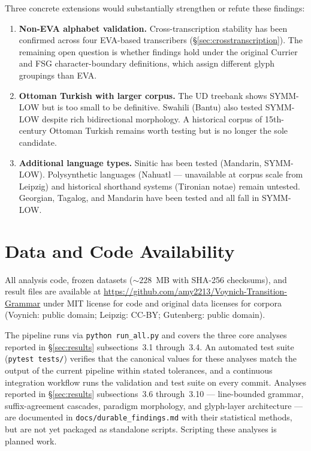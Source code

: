 \documentclass[11pt]{article}
\begin{document}
Three concrete extensions would substantially strengthen or refute these
findings:

\begin{enumerate}
  \item \textbf{Non-EVA alphabet validation.} Cross-transcription stability
        has been confirmed across four EVA-based transcribers
        (\S\ref{sec:crosstranscription}). The remaining open question
        is whether findings hold under the original Currier and FSG
        character-boundary definitions, which assign different glyph
        groupings than EVA.
  \item \textbf{Ottoman Turkish with larger corpus.} The UD treebank shows
        SYMM-LOW but is too small to be definitive. Swahili (Bantu) also
        tested SYMM-LOW despite rich bidirectional morphology. A historical
        corpus of 15th-century Ottoman Turkish remains worth testing but is
        no longer the sole candidate.
  \item \textbf{Additional language types.} Sinitic has been tested (Mandarin,
        SYMM-LOW).
        Polysynthetic languages (Nahuatl --- unavailable at corpus scale
        from Leipzig) and historical shorthand systems (Tironian notae)
        remain untested. Georgian, Tagalog, and Mandarin have been tested
        and all fall in SYMM-LOW.
\end{enumerate}

\section{Data and Code Availability}
\label{sec:data}

All analysis code, frozen datasets ($\sim 228$~MB with SHA-256 checksums),
and result files are available at
\url{https://github.com/amy2213/Voynich-Transition-Grammar} under MIT
license for code and original data licenses for corpora (Voynich: public
domain; Leipzig: CC-BY; Gutenberg: public domain).

The pipeline runs via \texttt{python run\_all.py} and covers the three
core analyses reported in \S\ref{sec:results} subsections~3.1 through~3.4.
An automated test suite (\texttt{pytest tests/}) verifies that the
canonical values for these analyses match the output of the current
pipeline within stated tolerances, and a continuous integration workflow
runs the validation and test suite on every commit. Analyses reported in
\S\ref{sec:results} subsections~3.6 through~3.10 --- line-bounded
grammar, suffix-agreement cascades, paradigm morphology, and glyph-layer
architecture --- are documented in \texttt{docs/durable\_findings.md}
with their statistical methods, but are not yet packaged as standalone
scripts. Scripting these analyses is planned work.



\end{document}
